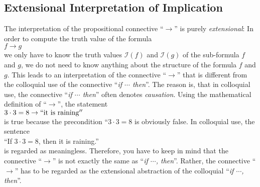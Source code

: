 \subsection{Extensional Interpretation of Implication}
The interpretation of the propositional connective ``$\rightarrow$'' is purely  \emph{extensional}:
In order to compute the truth value of the formula
\\[0.2cm]
\hspace*{1.3cm}
$f \rightarrow g$ 
\\[0.2cm]
we only have to know the truth values  $\mathcal{I}(f)$ and  $\mathcal{I}(g)$
 of the sub-formula  $f$ and $g$, we do not need to know anything
about the structure of the formula $f$ and $g$.  This leads to an interpretation of the connective
``$\rightarrow$'' that is different from the colloquial use of the connective
``\emph{if $\cdots$ then}''.  The reason is, that in colloquial use, the connective
``\emph{if $\cdots$ then}'' often denotes \emph{causation}.
Using the mathematical definition of ``$\rightarrow$'', the statement
\\[0.2cm]
\hspace*{1.3cm}
$3 \cdot 3 = 8 \rightarrow \mathrm{``it\ is\ raining''}$
\\[0.2cm]
is true because the precondition ``$3 \cdot 3 = 8$ is obviously false.  In colloquial use, the sentence
\\[0.2cm]
\hspace*{1.3cm}
``If $3 \cdot 3 = 8$, then it is raining.''
\\[0.2cm]
is regarded as meaningless.  Therefore, you have to keep in mind that the connective
``$\rightarrow$'' is not exactly the same as ``\emph{if $\cdots$, then}''.  Rather, the connective
``$\rightarrow$'' has to be regarded as the extensional abstraction of the colloquial  
``\emph{if $\cdots$, then}''.


